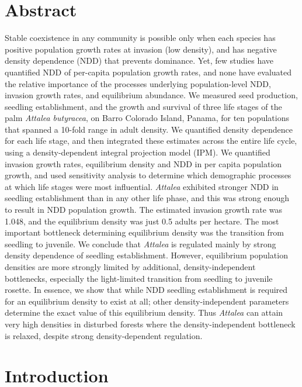 \documentclass[b5paper,justified]{tufte-book} %
\begin{document}
\section{Abstract} 
\begin{fullwidth} 
Stable coexistence in any community is possible only when each species has positive population growth rates at invasion (low density), and has negative density dependence (NDD) that prevents dominance. Yet, few studies have quantified NDD of per-capita population growth rates, and none have evaluated the relative importance of the processes underlying population-level NDD, invasion growth rates, and equilibrium abundance. We measured seed production, seedling establishment, and the growth and survival of three life stages of the palm \textit{Attalea butyracea}, on Barro Colorado Island, Panama, for ten populations that spanned a 10-fold range in adult density. We quantified density dependence for each life stage, and then integrated these estimates across the entire life cycle, using a density-dependent integral projection model (IPM). We quantified invasion growth rates, equilibrium density and NDD in per capita population growth, and used sensitivity analysis to determine which demographic processes at which life stages were most influential. \textit{Attalea} exhibited stronger NDD in seedling establishment than in any other life phase, and this was strong enough to result in NDD population growth. The estimated invasion growth rate was 1.048, and the equilibrium density was just 0.5 adults per hectare. The most important bottleneck determining equilibrium density was the transition from seedling to juvenile.  We conclude that \textit{Attalea} is regulated mainly by strong density dependence of seedling establishment.  However, equilibrium population densities are more strongly limited by additional, density-independent bottlenecks, especially the light-limited transition from seedling to juvenile rosette. In essence, we show that while NDD seedling establishment is required for an equilibrium density to exist at all; other density-independent parameters determine the exact value of this equilibrium density.  Thus \textit{Attalea} can attain very high densities in disturbed forests where the density-independent bottleneck is relaxed, despite strong density-dependent regulation.

\section{Introduction}


\end{fullwidth}
\end{document}
